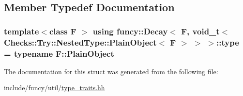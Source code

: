 \subsection{Member Typedef Documentation}
\hypertarget{structfuncy_1_1Decay_3_01F_00_01void__t_3_01Checks_1_1Try_1_1NestedType_1_1PlainObject_3_01F_01_4_01_4_01_4_abe1451b1bf490b74b1aeb260417d7373}{
\subsubsection[{type}]{\setlength{\rightskip}{0pt plus 5cm}template$<$class F $>$ using {\bf funcy\-::\-Decay}$<$ F, {\bf void\-\_\-t}$<$ Checks\-::\-Try\-::\-Nested\-Type\-::\-Plain\-Object$<$ F $>$ $>$ $>$\-::{\bf type} =  typename F\-::\-Plain\-Object}}\label{structfuncy_1_1Decay_3_01F_00_01void__t_3_01Checks_1_1Try_1_1NestedType_1_1PlainObject_3_01F_01_4_01_4_01_4_abe1451b1bf490b74b1aeb260417d7373}


The documentation for this struct was generated from the following file\-:\begin{DoxyCompactItemize}
\item 
include/funcy/util/\hyperlink{type__traits_8hh}{type\-\_\-traits.\-hh}\end{DoxyCompactItemize}
